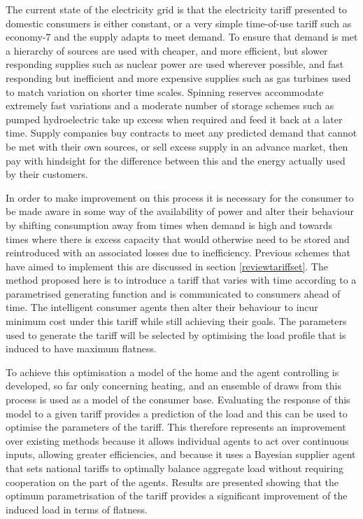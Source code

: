 \documentclass[a4paper, 10 pt, conference]{ieeeconf}  %
\begin{document}
The current state of the electricity grid is that the electricity tariff presented to domestic consumers is either constant, or a very simple time-of-use tariff such as economy-7 and the supply adapts to meet demand. To ensure that demand is met a hierarchy of sources are used with cheaper, and more efficient, but slower responding supplies such as nuclear power are used wherever possible, and fast responding but inefficient and more expensive supplies such as gas turbines used to match variation on shorter time scales. Spinning reserves accommodate extremely fast variations and a moderate number of storage schemes such as pumped hydroelectric take up excess when required and feed it back at a later time. Supply companies buy contracts to meet any predicted demand that cannot be met with their own sources, or sell excess supply in an advance market, then pay with hindsight for the difference between this and the energy actually used by their customers.

In order to make improvement on this process it is necessary for the consumer to be made aware in some way of the availability of power and alter their behaviour by shifting consumption away from times when demand is high and towards times where there is excess capacity that would otherwise need to be stored and reintroduced with an associated losses due to inefficiency. Previous schemes that have aimed to implement this are discussed in section \ref{reviewtariffset}. The method proposed here is to introduce a tariff that varies with time according to a parametrised generating function and is communicated to consumers ahead of time. The intelligent consumer agents then alter their behaviour to incur minimum cost under this tariff while still achieving their goals. The parameters used to generate the tariff will be selected by optimising the load profile that is induced to have maximum flatness.

To achieve this optimisation a model of the home and the agent controlling is developed, so far only concerning heating, and an ensemble of draws from this process is used as a model of the consumer base. Evaluating the response of this model to a given tariff provides a prediction of the load and this can be used to optimise the parameters of the tariff. This therefore represents an improvement over existing methods because it allows individual agents to act over continuous inputs, allowing greater efficiencies, and because it uses a Bayesian supplier agent that sets national tariffs to optimally balance aggregate load without requiring cooperation on the part of the agents. Results are presented showing that the optimum parametrisation of the tariff provides a significant improvement of the induced load in terms of flatness.
\end{document}
